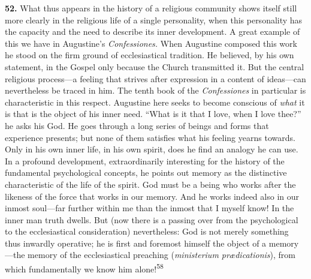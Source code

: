 \documentclass[12pt,a4paper]{book}
\newcommand{\opage}[1]{\marginnote{\footnotesize\textit{[#1]}}}
\begin{document}
\noindent\textbf{52.} What thus appears in the history of a religious community shows itself
still more clearly in the religious life of a single personality, when this personality has
the capacity and the need to describe its inner development. A great example of this we have
in Augustine's \emph{Confessiones.} When Augustine composed this work he stood on the firm
ground of ecclesiastical tradition. He believed, by his own statement, in the Gospel only
because the Church transmitted it. But the central religious process---a feeling that strives
after expression in a content of ideas---can nevertheless be traced in him. The tenth book of
the \emph{Confessiones} in particular is characteristic in this respect. Augustine here seeks
to become conscious of \emph{what} it is that is the object of his inner need. ``What is it
that I love, when I love thee?'' he asks his God. He goes through a long series of beings and
forms that experience presents; but none of them satisfies what his feeling yearns towards.
Only in his own inner life, in his own spirit, does he find an analogy he 
\opage{116}can use. In a
profound development, extraordinarily interesting for the history of the fundamental
psychological concepts, he points out memory as the distinctive characteristic of the life of
the spirit. God must be a being who works after the likeness of the force that works in our
memory. And he works indeed also in our inmost soul---far further within me than the inmost
that I myself know! In the inner man truth dwells. But (now there is a passing over from the
psychological to the ecclesiastical consideration) nevertheless: God is not merely something
thus inwardly operative; he is first and foremost himself the object of a memory---the memory
of the ecclesiastical preaching (\textit{ministerium prædicationis}), from which fundamentally
we know him alone!\textsuperscript{58}
\end{document}
